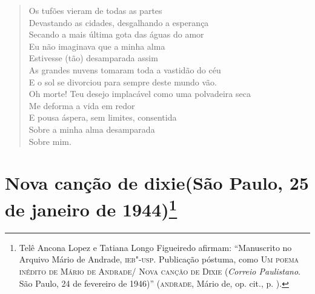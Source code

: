 \begin{verse}
Os tufões vieram de todas as partes\\
Devastando as cidades, desgalhando a esperança\\
Secando a mais última gota das águas do amor\\
Eu não imaginava que a minha alma\\
Estivesse (tão) desamparada assim\\
As grandes nuvens tomaram toda a vastidão do céu\\
E o sol se divorciou para sempre deste mundo vão.\\
Oh morte! Teu desejo implacável como uma polvadeira seca\\
Me deforma a vida em redor\\
E pousa áspera, sem limites, consentida\\
Sobre a minha alma desamparada\\
Sobre mim.
\end{verse}

\pagebreak
\section[Nova canção de dixie]{Nova canção de dixie\break(São Paulo, 25 de janeiro de 1944)\footnote[*]{Telê Ancona Lopez e Tatiana Longo
  Figueiredo afirmam: ``Manuscrito no Arquivo Mário de Andrade, \textsc{ieb"-usp}.
  Publicação póstuma, como \textsc{Um poema inédito de Mário de Andrade/
  Nova canção de Dixie} (\emph{Correio Paulistano}. São Paulo, 24 de
  fevereiro de 1946)'' (\textsc{andrade}, Mário de, op. cit., p. ).}}


